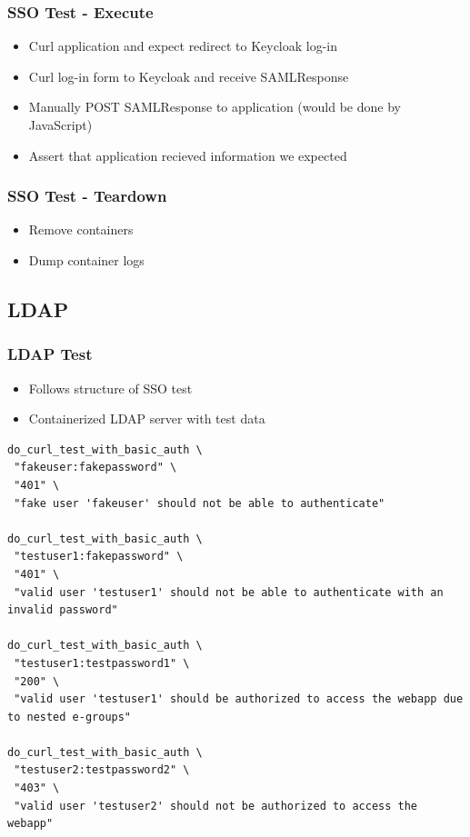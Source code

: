 \documentclass[14pt,aspectratio=169]{beamer}
\begin{document}
\begin{frame}
  \frametitle{SSO Test - Execute}
  \begin{itemize}
    \item Curl application and expect redirect to Keycloak log-in
    \item Curl log-in form to Keycloak and receive SAMLResponse
    \item Manually POST SAMLResponse to application (would be done by JavaScript)
    \item Assert that application recieved information we expected
  \end{itemize}
\end{frame}

\begin{frame}
  \frametitle{SSO Test - Teardown}
  \begin{itemize}
    \item Remove containers
    \item Dump container logs
  \end{itemize}
\end{frame}

\subsection{LDAP}

\begin{frame}[fragile]
  \frametitle{LDAP Test}
  \begin{itemize}
    \item Follows structure of SSO test
    \item Containerized LDAP server with test data
  \end{itemize}
  \begin{verbatim}
do_curl_test_with_basic_auth \
 "fakeuser:fakepassword" \
 "401" \
 "fake user 'fakeuser' should not be able to authenticate"

do_curl_test_with_basic_auth \
 "testuser1:fakepassword" \
 "401" \
 "valid user 'testuser1' should not be able to authenticate with an invalid password"

do_curl_test_with_basic_auth \
 "testuser1:testpassword1" \
 "200" \
 "valid user 'testuser1' should be authorized to access the webapp due to nested e-groups"

do_curl_test_with_basic_auth \
 "testuser2:testpassword2" \
 "403" \
 "valid user 'testuser2' should not be authorized to access the webapp"
  \end{verbatim}
\end{frame}
\end{document}
